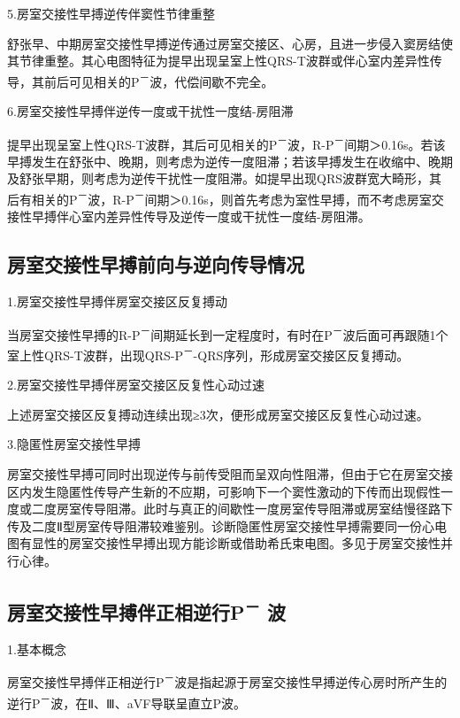 5.房室交接性早搏逆传伴窦性节律重整

舒张早、中期房室交接性早搏逆传通过房室交接区、心房，且进一步侵入窦房结使其节律重整。其心电图特征为提早出现呈室上性QRS-T波群或伴心室内差异性传导，其前后可见相关的P\textsuperscript{－}波，代偿间歇不完全。

6.房室交接性早搏伴逆传一度或干扰性一度结-房阻滞

提早出现呈室上性QRS-T波群，其后可见相关的P\textsuperscript{－}波，R-P\textsuperscript{－}间期＞0.16s。若该早搏发生在舒张中、晚期，则考虑为逆传一度阻滞；若该早搏发生在收缩中、晚期及舒张早期，则考虑为逆传干扰性一度阻滞。如提早出现QRS波群宽大畸形，其后有相关的P\textsuperscript{－}波，R-P\textsuperscript{－}间期＞0.16s，则首先考虑为室性早搏，而不考虑房室交接性早搏伴心室内差异性传导及逆传一度或干扰性一度结-房阻滞。

\protect\hypertarget{text00018.htmlux5cux23subid148}{}{}

\subsection{房室交接性早搏前向与逆向传导情况}

1.房室交接性早搏伴房室交接区反复搏动

当房室交接性早搏的R-P\textsuperscript{－}间期延长到一定程度时，有时在P\textsuperscript{－}波后面可再跟随1个室上性QRS-T波群，出现QRS-P\textsuperscript{－}-QRS序列，形成房室交接区反复搏动。

2.房室交接性早搏伴房室交接区反复性心动过速

上述房室交接区反复搏动连续出现≥3次，便形成房室交接区反复性心动过速。

3.隐匿性房室交接性早搏

房室交接性早搏可同时出现逆传与前传受阻而呈双向性阻滞，但由于它在房室交接区内发生隐匿性传导产生新的不应期，可影响下一个窦性激动的下传而出现假性一度或二度房室传导阻滞。此时与真正的间歇性一度房室传导阻滞或房室结慢径路下传及二度Ⅱ型房室传导阻滞较难鉴别。诊断隐匿性房室交接性早搏需要同一份心电图有显性的房室交接性早搏出现方能诊断或借助希氏束电图。多见于房室交接性并行心律。

\protect\hypertarget{text00018.htmlux5cux23subid149}{}{}

\subsection{房室交接性早搏伴正相逆行P\textsuperscript{－} 波}

1.基本概念

房室交接性早搏伴正相逆行P\textsuperscript{－}波是指起源于房室交接性早搏逆传心房时所产生的逆行P\textsuperscript{－}波，在Ⅱ、Ⅲ、aVF导联呈直立P波。

